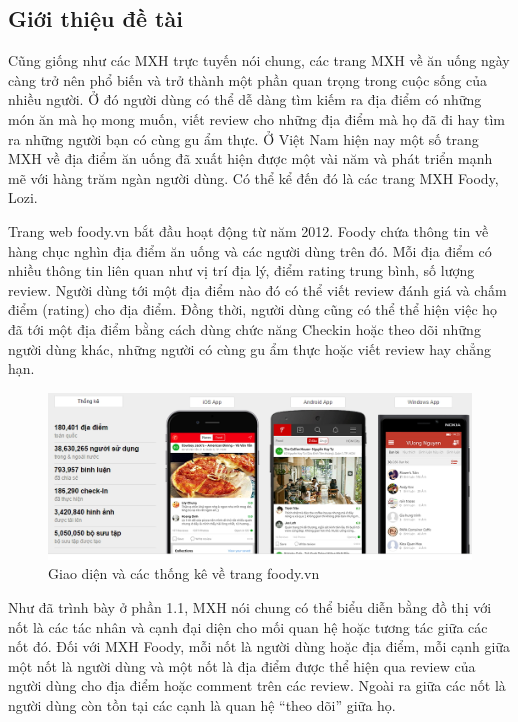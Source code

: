 \documentclass[12pt]{extarticle}
\begin{document}
		\subsection{Giới thiệu đề tài}
			\par Cũng giống như các MXH trực tuyến nói chung, các trang MXH về ăn uống ngày càng trở nên phổ biến và trở thành một phần quan trọng trong cuộc sống của nhiều người. Ở đó người dùng có thể dễ dàng tìm kiếm ra địa điểm có những món ăn mà họ mong muốn, viết review cho những địa điểm mà họ đã đi hay tìm ra những người bạn có cùng gu ẩm thực. Ở Việt Nam hiện nay một số trang MXH về địa điểm ăn uống đã xuất hiện được một vài năm và phát triển mạnh mẽ với hàng trăm ngàn người dùng. Có thể kể đến đó là các trang MXH Foody, Lozi.
			\par Trang web foody.vn bắt đầu hoạt động từ năm 2012. Foody chứa thông tin về hàng chục nghìn địa điểm ăn uống và các người dùng trên đó. Mỗi địa điểm có nhiều thông tin liên quan như vị trí địa lý, điểm rating trung bình, số lượng review. Người dùng tới một địa điểm nào đó có thể viết review đánh giá và chấm điểm (rating) cho địa điểm. Đồng thời, người dùng cũng có thể thể hiện việc họ đã tới một địa điểm bằng cách dùng chức năng Checkin hoặc theo dõi những người dùng khác, những người có cùng gu ẩm thực hoặc viết review hay chẳng hạn.

			\begin{figure}[h!]
				\includegraphics[width=\linewidth]{foody}
				\caption{Giao diện và các thống kê về trang foody.vn}
				\label{fig:foody}
			\end{figure}

			\par Như đã trình bày ở phần 1.1, MXH nói chung có thể biểu diễn bằng đồ thị với nốt là các tác nhân và cạnh đại diện cho mối quan hệ hoặc tương tác giữa các nốt đó. Đối với MXH Foody, mỗi nốt là người dùng hoặc địa điểm, mỗi cạnh giữa một nốt là người dùng và một nốt là địa điểm được thể hiện qua review của người dùng cho địa điểm hoặc comment trên các review. Ngoài ra giữa các nốt là người dùng còn tồn tại các cạnh là quan hệ “theo dõi” giữa họ.
\end{document}
